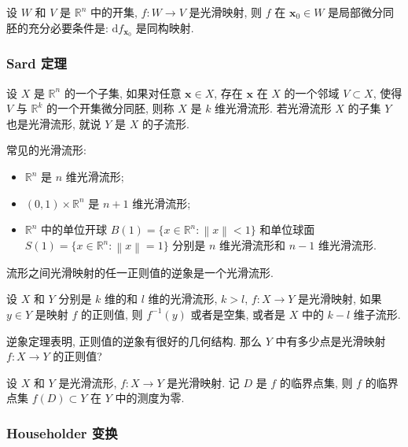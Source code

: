 \begin{corollary}
  设 \(W\) 和 \(V\) 是 \(\mathbb{R}^n\) 中的开集, \(f:W\to V\) 是光滑映射, 则 \(f\) 在 \(\boldsymbol{x}_0\in W\) 是局部微分同胚的充分必要条件是: \(\mathrm{d}f_{\boldsymbol{x}_0}\) 是同构映射.
\end{corollary}

\subsubsection{Sard 定理}

\begin{definition}
  设 \(X\) 是 \(\mathbb{R}^n\) 的一个子集, 如果对任意 \(\boldsymbol{x}\in X\), 存在 \(\boldsymbol{x}\) 在 \(X\) 的一个邻域 \(V\subset X\), 使得 \(V\) 与 \(\mathbb{R}^k\) 的一个开集微分同胚, 则称 \(X\) 是 \(k\) 维光滑流形. 若光滑流形 \(X\) 的子集 \(Y\) 也是光滑流形, 就说 \(Y\) 是 \(X\) 的子流形.
\end{definition}

常见的光滑流形:
\begin{itemize}
  \item \(\mathbb{R}^n\) 是 \(n\) 维光滑流形;
  \item \((0,1)\times\mathbb{R}^n\) 是 \(n+1\) 维光滑流形;
  \item \(\mathbb{R}^n\) 中的单位开球 \(B(1)=\lbrace x\in\mathbb{R}^n: \left\lVert x\right\rVert < 1\rbrace\) 和单位球面 \(S(1)=\lbrace x\in\mathbb{R}^n: \left\lVert x\right\rVert =1\rbrace\) 分别是 \(n\) 维光滑流形和 \(n-1\) 维光滑流形.
\end{itemize}

流形之间光滑映射的任一正则值的逆象是一个光滑流形.

\begin{theorem}[逆象定理]
  设 \(X\) 和 \(Y\) 分别是 \(k\) 维的和 \(l\) 维的光滑流形, \(k>l\), \(f:X\to Y\) 是光滑映射, 如果 \(y\in Y\) 是映射 \(f\) 的正则值, 则 \(f^{-1}(y)\) 或者是空集, 或者是 \(X\) 中的 \(k-l\) 维子流形.
\end{theorem}

逆象定理表明, 正则值的逆象有很好的几何结构. 那么 \(Y\) 中有多少点是光滑映射 \(f:X\to Y\) 的正则值?

\begin{theorem}[Sard 定理]
  设 \(X\) 和 \(Y\) 是光滑流形, \(f:X\to Y\) 是光滑映射. 记 \(D\) 是 \(f\) 的临界点集, 则 \(f\) 的临界点集 \(f(D)\subset Y\) 在 \(Y\) 中的测度为零.
\end{theorem}

\subsubsection{Householder 变换}

